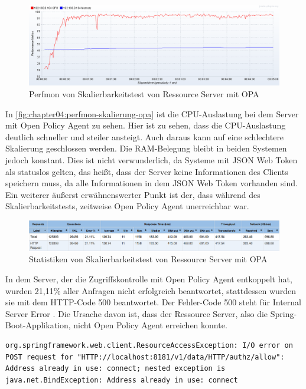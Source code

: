\begin{figure}[H]
  \centering
  \includegraphics[width=1.0\textwidth]{gfx/perfmon-skalierung-opa.png}
  \caption{Perfmon von Skalierbarkeitstest von Ressource Server mit OPA}
  \label{fig:chapter04:perfmon-skalierung-opa}
\end{figure}

In \autoref{fig:chapter04:perfmon-skalierung-opa} ist die CPU-Auslastung bei dem Server mit Open Policy Agent zu sehen. Hier ist zu sehen, dass die CPU-Auslastung deutlich schneller und steiler ansteigt. Auch daraus kann auf eine schlechtere Skalierung geschlossen werden. 
Die RAM-Belegung bleibt in beiden Systemen jedoch konstant. Dies ist nicht verwunderlich, da Systeme mit JSON Web Token als statuslos gelten, das heißt, dass der Server keine Informationen des Clients speichern muss, da alle Informationen in dem JSON Web Token vorhanden sind. 
Ein weiterer äußerst erwähnenswerter Punkt ist der, dass während des Skalierbarkeitstests, zeitweise Open Policy Agent unerreichbar war. 

\begin{figure}[H]
  \centering
  \includegraphics[width=1.0\textwidth]{gfx/statistik-skalierung-opa.png}
  \caption{Statistiken von Skalierbarkeitstest von Ressource Server mit OPA}
  \label{fig:chapter04:statistik-skalierung-opa}
\end{figure}

In dem Server, der die Zugriffskontrolle mit Open Policy Agent entkoppelt hat, wurden 21,11\% aller Anfragen nicht erfolgreich beantwortet, stattdessen wurden sie mit dem HTTP-Code 500 beantwortet. Der Fehler-Code 500 steht für Internal Server Error \citep{mdnwebdocs:2021}. Die Ursache davon ist, dass der Ressource Server, also die Spring-Boot-Applikation, nicht Open Policy Agent erreichen konnte. 

\begin{lstlisting}[frame=tb,caption={Fehlermeldung Spring-Boot},label=lst:FehlermeldungSpring-Boot]
  org.springframework.web.client.ResourceAccessException: I/O error on POST request for "HTTP://localhost:8181/v1/data/HTTP/authz/allow": Address already in use: connect; nested exception is java.net.BindException: Address already in use: connect
\end{lstlisting}
\bigskip

